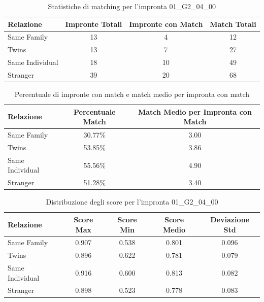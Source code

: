 \begin{table}[htbp]
\centering
\caption{Statistiche di matching per l'impronta 01\_G2\_04\_00}
\label{tab:results_01_G2_04_00}
\begin{tabular}{|l|c|c|c|}
\hline
\textbf{Relazione} & \textbf{Impronte Totali} & \textbf{Impronte con Match} & \textbf{Match Totali} \\
\hline
Same Family & 13 & 4 & 12 \\
\hline
Twins & 13 & 7 & 27 \\
\hline
Same Individual & 18 & 10 & 49 \\
\hline
Stranger & 39 & 20 & 68 \\
\hline
\end{tabular}
\end{table}


\begin{table}[htbp]
\centering
\caption{Percentuale di impronte con match e match medio per impronta con match}
\label{tab:match_percentage_01_G2_04_00}
\begin{tabular}{|l|c|c|}
\hline
\textbf{Relazione} & \textbf{Percentuale Match} & \textbf{Match Medio per Impronta con Match} \\
\hline
Same Family & 30.77\% & 3.00 \\
\hline
Twins & 53.85\% & 3.86 \\
\hline
Same Individual & 55.56\% & 4.90 \\
\hline
Stranger & 51.28\% & 3.40 \\
\hline
\end{tabular}
\end{table}


\begin{table}[htbp]
\centering
\caption{Distribuzione degli score per l'impronta 01\_G2\_04\_00}
\label{tab:scores_01_G2_04_00}
\begin{tabular}{|l|c|c|c|c|}
\hline
\textbf{Relazione} & \textbf{Score Max} & \textbf{Score Min} & \textbf{Score Medio} & \textbf{Deviazione Std} \\
\hline
Same Family & 0.907 & 0.538 & 0.801 & 0.096 \\
\hline
Twins & 0.896 & 0.622 & 0.781 & 0.079 \\
\hline
Same Individual & 0.916 & 0.600 & 0.813 & 0.082 \\
\hline
Stranger & 0.898 & 0.523 & 0.778 & 0.083 \\
\hline
\end{tabular}
\end{table}

